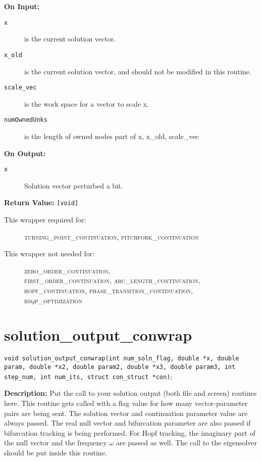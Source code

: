 {\bf On Input:}
\begin{description}
\item[\texttt{x}] is the current solution vector.
\item[\texttt{x\_old}] is the current solution vector, and should not be modified in this routine.
\item[\texttt{scale\_vec}] is the work space for a vector to scale x.
\item[\texttt{numOwnedUnks}] is the length of owned nodes part of x, x\_old, scale\_vec
\end{description}

{\bf On Output:}
\begin{description}
\item[\texttt{x}]   Solution vector perturbed a bit.
\end{description}

{\bf Return Value:} \texttt{[void]} 

\begin{description}
\item[This wrapper required for:]
\textsc{turning\_point\_continuation, pitchfork\_continuation}
\item[This wrapper not needed for:]
\textsc{zero\_order\_continuation,\\
first\_order\_continuation, arc\_length\_continuation, \\
hopf\_continuation, phase\_transition\_continuation, \\
rsqp\_optimization}
\end{description}

\section{solution\_output\_conwrap}
\texttt{void solution\_output\_conwrap(int num\_soln\_flag, double *x, double param, 
 double *x2, double param2, double *x3, double param3, int step\_num, int num\_its,
                             struct con\_struct *con)};

{\bf Description:} Put the call to your solution output (both file and screen) routines here. This routine gets called with a flag value for how many vector-parameter 
pairs are being sent. The solution vector and continuation parameter value are always passed. The real null vector and bifurcation parameter are also passed if bifurcation tracking is being performed. For Hopf tracking, the imaginary part of the null vector and the frequency $\omega$ are passed as well. The call to the eigensolver should be put inside this routine. \\

